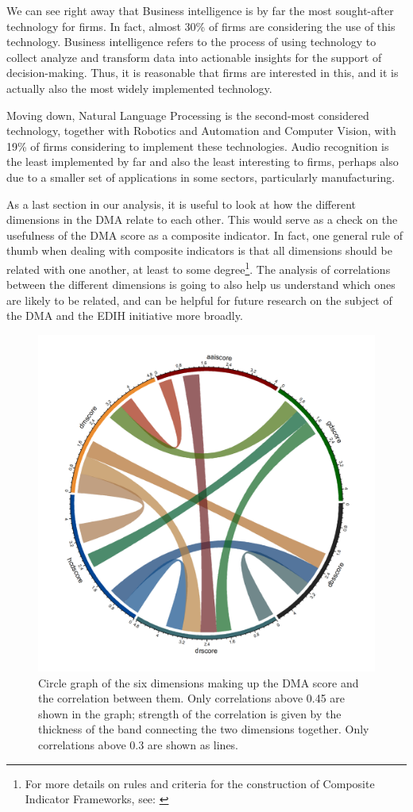 \documentclass[12pt]{report}
\begin{document}
\par We can see right away that Business intelligence is by far the most sought-after technology for firms. In fact, almost 30\% of firms are considering the use of this technology. Business intelligence refers to the process of using technology to collect analyze and transform data into actionable insights for the support of decision-making. Thus, it is reasonable that firms are interested in this, and it is actually also the most widely implemented technology. 

\par Moving down, Natural Language Processing is the second-most considered technology, together with Robotics and Automation and Computer Vision, with 19\% of firms considering to implement these technologies. Audio recognition is the least implemented by far and also the least interesting to firms, perhaps also due to a smaller set of applications in some sectors, particularly manufacturing.



\par As a last section in our analysis, it is useful to look at how the different dimensions in the DMA relate to each other. This would serve as a check on the usefulness of the DMA score as a composite indicator. In fact, one general rule of thumb when dealing with composite indicators is that all dimensions should be related with one another, at least to some degree\footnote{For more details on rules and criteria for the construction of Composite Indicator Frameworks, see: \cite{oecd2008}}. The analysis of correlations between the different dimensions is going to also help us understand which ones are likely to be related, and can be helpful for future research on the subject of the DMA and the EDIH initiative more broadly.

\begin{figure}[h!]
    \centering
    \includegraphics[width=0.65\linewidth]{../Output/theverysmallcorrmatrix_plot.png}
    \caption{\centering Circle graph of the six dimensions making up the DMA score and the correlation between them. Only correlations above 0.45 are shown in the graph; strength of the correlation is given by the thickness of the band connecting the two dimensions together. Only correlations above 0.3 are shown as lines.}
    \label{fig:circlize_graph}
\end{figure}
\end{document}
